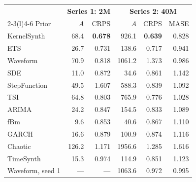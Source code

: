 \begin{tabular}{@{}lrrrrr@{}}
\toprule
 & \multicolumn{2}{c}{Series 1: 2M} & \multicolumn{3}{c}{Series 2: 40M}\\
\cmidrule(lr){2-3}\cmidrule(l){4-6}
Prior & $A$ & CRPS & $A$ & CRPS & MASE\\
\midrule
KernelSynth & 68.4 & \textbf{0.678} & 926.1 & \textbf{0.639} & 0.828 \\
ETS & 26.7 & 0.731 & 138.6 & 0.717 & 0.941 \\
Waveform & 70.9 & 0.818 & 1061.2 & 1.373 & 0.986 \\
SDE & 11.0 & 0.872 & 34.6 & 0.861 & 1.142 \\
StepFunction & 49.5 & 1.607 & 588.3 & 0.839 & 1.092 \\
TSI & 64.8 & 0.803 & 765.9 & 0.776 & 1.028 \\
ARIMA & 24.2 & 0.847 & 154.5 & 0.833 & 1.089 \\
fBm & 9.6 & 0.853 & 40.6 & 0.867 & 1.110 \\
GARCH & 16.6 & 0.879 & 100.9 & 0.874 & 1.116 \\
Chaotic & 126.2 & 1.171 & 1956.6 & 1.285 & 1.616 \\
TimeSynth & 15.3 & 0.974 & 114.9 & 0.851 & 1.123 \\
\midrule
Waveform, seed 1 & --- & --- & 1063.6 & 0.972 & 0.995 \\
\bottomrule
\end{tabular}
